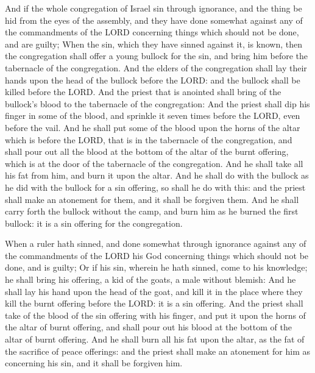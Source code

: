  And if the whole congregation of Israel sin through
ignorance, and the thing be hid from the eyes of the assembly, and they
have done somewhat against any of the commandments of the LORD
concerning things which should not be done, and are guilty;
 When the sin, which they have sinned against it, is known,
then the congregation shall offer a young bullock for the sin, and bring
him before the tabernacle of the congregation.  And the
elders of the congregation shall lay their hands upon the head of the
bullock before the LORD: and the bullock shall be killed before the
LORD.  And the priest that is anointed shall bring of the
bullock's blood to the tabernacle of the congregation:  And
the priest shall dip his finger in some of the blood, and sprinkle it
seven times before the LORD, even before the vail.  And he
shall put some of the blood upon the horns of the altar which is before
the LORD, that is in the tabernacle of the congregation, and shall pour
out all the blood at the bottom of the altar of the burnt offering,
which is at the door of the tabernacle of the congregation.
 And he shall take all his fat from him, and burn it upon
the altar.  And he shall do with the bullock as he did with
the bullock for a sin offering, so shall he do with this: and the priest
shall make an atonement for them, and it shall be forgiven them.
 And he shall carry forth the bullock without the camp, and
burn him as he burned the first bullock: it is a sin offering for the
congregation.

 When a ruler hath sinned, and done somewhat through
ignorance against any of the commandments of the LORD his God concerning
things which should not be done, and is guilty;  Or if his
sin, wherein he hath sinned, come to his knowledge; he shall bring his
offering, a kid of the goats, a male without blemish:  And
he shall lay his hand upon the head of the goat, and kill it in the
place where they kill the burnt offering before the LORD: it is a sin
offering.  And the priest shall take of the blood of the
sin offering with his finger, and put it upon the horns of the altar of
burnt offering, and shall pour out his blood at the bottom of the altar
of burnt offering.  And he shall burn all his fat upon the
altar, as the fat of the sacrifice of peace offerings: and the priest
shall make an atonement for him as concerning his sin, and it shall be
forgiven him.

